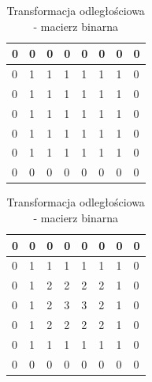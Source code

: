 \begin{table}
\centering
\begin{minipage}[b]{80mm}
\centering
\begin{tabular}{|l|l|l|l|l|l|l|l|}
\hline
0&0&0&0&0&0&0&0 \\ \hline
0&1&1&1&1&1&1&0 \\ \hline
0&1&1&1&1&1&1&0 \\ \hline
0&1&1&1&1&1&1&0 \\ \hline
0&1&1&1&1&1&1&0 \\ \hline
0&1&1&1&1&1&1&0 \\ \hline
0&0&0&0&0&0&0&0 \\ \hline
\end{tabular}
\caption*{Binarny obraz wejściowy}
\end{minipage}
\begin{minipage}[b]{70mm}
\centering
\begin{tabular}{|l|l|l|l|l|l|l|l|}
\hline
0&0&0&0&0&0&0&0 \\ \hline
0&1&1&1&1&1&1&0 \\ \hline
0&1&2&2&2&2&1&0 \\ \hline
0&1&2&3&3&2&1&0 \\ \hline
0&1&2&2&2&2&1&0 \\ \hline
0&1&1&1&1&1&1&0 \\ \hline
0&0&0&0&0&0&0&0 \\ \hline
\end{tabular}
\caption*{Transformata odległościowa}
\end{minipage}
\caption{Transformacja odległościowa - macierz binarna} \label{tab:distance_transform} 
\end{table}

